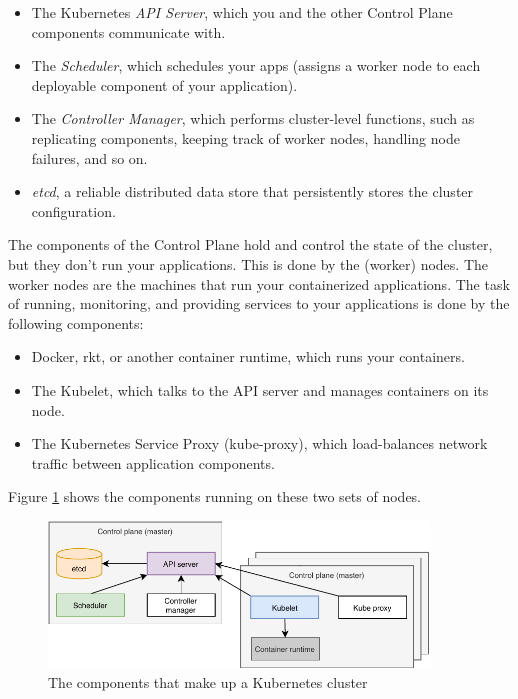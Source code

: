 \begin{itemize}
	\item The Kubernetes \textit{API Server}, which you and the other Control Plane components communicate with.
	\item The \textit{Scheduler}, which schedules your apps (assigns a worker node to each deployable component of your application).
	\item The \textit{Controller Manager}, which performs cluster-level functions, such as replicating components, keeping track of worker nodes, handling node failures, and so on.
	\item \textit{etcd}, a reliable distributed data store that persistently stores the cluster configuration. 
\end{itemize}
The components of the Control Plane hold and control the state of the cluster, but they don’t run your applications. This is done by the (worker) nodes.
The worker nodes are the machines that run your containerized applications. The task of running, monitoring, and providing services to your applications is done by the following components:
\begin{itemize}
	\item Docker, rkt, or another container runtime, which runs your containers.
	\item The Kubelet, which talks to the API server and manages containers on its node.
	\item The Kubernetes Service Proxy (kube-proxy), which load-balances network traffic
	between application components.
\end{itemize}
Figure \ref{fig:kubecluster} shows the components running on these two sets of nodes.


\begin{figure}[htbp]
	\centering
	\includegraphics[width=0.9\textwidth]{images/kubecluster.pdf}
	\caption{The components that make up a Kubernetes cluster}
	\label{fig:kubecluster}
\end{figure}



